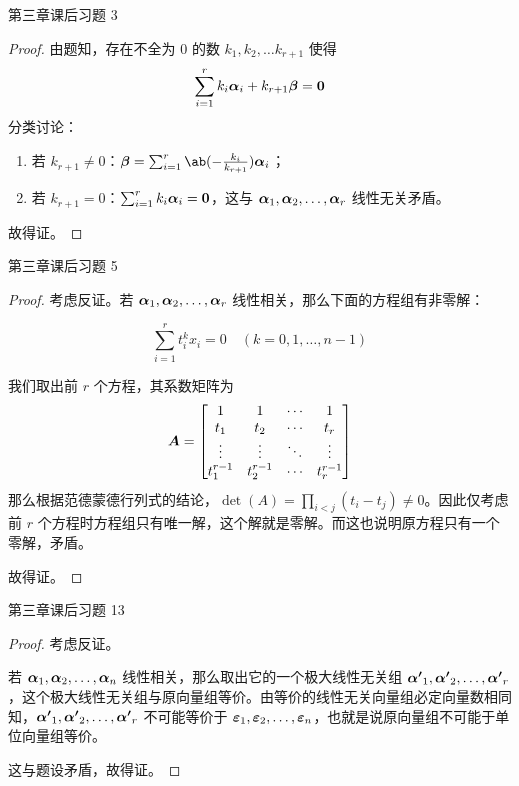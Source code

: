 \begin{problem}
	第三章课后习题 3
	\begin{proof}
		由题知，存在不全为 $0$ 的数 $k_1, k_2, \dots k_{r+1}$ 使得
		$$
		\sum_{i=1}^r k_i \boldsymbol{\alpha}_i + k_{r+1} \boldsymbol{\beta} = \boldsymbol{0}
		$$
		分类讨论：

		\begin{enumerate}
			\item 若 $k_{r+1} \neq 0$：$\vect{\beta} = \sum_{i=1}^r \ab(-\frac{k_i}{k_{r+1}}) \vect{\alpha}_i$；
			\item 若 $k_{r+1} = 0$：$\sum_{i=1}^r k_i \boldsymbol{\alpha}_i = \boldsymbol{0}$，这与 $\boldsymbol{\alpha}_1, \boldsymbol{\alpha}_2, \dots, \boldsymbol{\alpha}_r$ 线性无关矛盾。
		\end{enumerate}

		故得证。
	\end{proof}
\end{problem}

\begin{problem}
	第三章课后习题 5
	\begin{proof}
		考虑反证。若 $\boldsymbol{\alpha}_1, \boldsymbol{\alpha}_2, \dots, \boldsymbol{\alpha}_r$ 线性相关，那么下面的方程组有非零解：

		$$
		\sum_{i=1}^r t_i^k x_i = 0 \quad (k=0,1,\dots,n-1)
		$$

		我们取出前 $r$ 个方程，其系数矩阵为
		$$
		\boldsymbol{A} = \begin{bmatrix}
			1 & 1 & \cdots & 1 \\
			t_1 & t_2 & \cdots & t_r \\
			\vdots & \vdots & \ddots & \vdots \\
			t_1^{r-1} & t_2^{r-1} & \cdots & t_r^{r-1}
		\end{bmatrix}
		$$
		那么根据范德蒙德行列式的结论，$\det(A) = \prod_{i<j} (t_i - t_j) \neq 0$。因此仅考虑前 $r$ 个方程时方程组只有唯一解，这个解就是零解。而这也说明原方程只有一个零解，矛盾。

		故得证。
	\end{proof}
\end{problem}

\begin{problem}
	第三章课后习题 13
	\begin{proof}
		考虑反证。

		若 $\boldsymbol{\alpha}_1, \boldsymbol{\alpha}_2, \dots, \boldsymbol{\alpha}_n$ 线性相关，那么取出它的一个极大线性无关组 $\boldsymbol{\alpha'}_1, \boldsymbol{\alpha'}_2, \dots, \boldsymbol{\alpha'}_r$，这个极大线性无关组与原向量组等价。由等价的线性无关向量组必定向量数相同知，$\boldsymbol{\alpha'}_1, \boldsymbol{\alpha'}_2, \dots, \boldsymbol{\alpha'}_r$ 不可能等价于 $\boldsymbol{\varepsilon}_1, \boldsymbol{\varepsilon}_2, \dots, \boldsymbol{\varepsilon}_n$，也就是说原向量组不可能于单位向量组等价。
		
		这与题设矛盾，故得证。
	\end{proof}
\end{problem}

